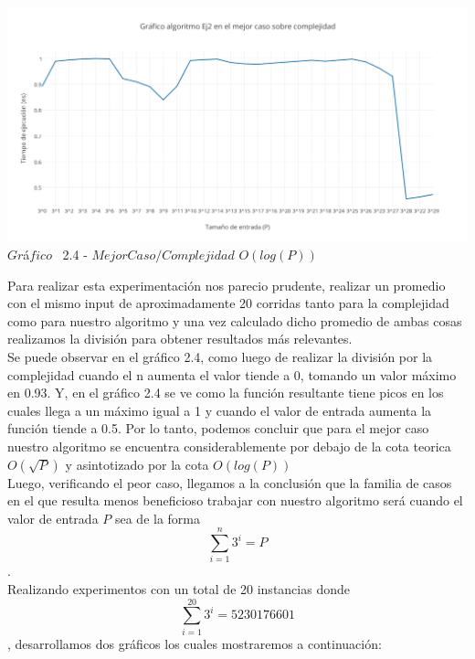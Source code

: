 \vspace*{0.3cm} \vspace*{0.3cm}
  \begin{center}
\includegraphics[scale=0.65]{./EJ2/mejorcaso3.png}
{$Gr$\'a$fico$ \ 2.4 - $Mejor Caso / Complejidad$ $O(log(P))$}
  \end{center}
  \vspace*{0.3cm}

Para realizar esta experimentaci\'on nos parecio prudente, realizar un promedio con el mismo input de aproximadamente 20 corridas
tanto para la complejidad como para nuestro algoritmo y una vez calculado dicho promedio de ambas cosas realizamos la divisi\'on para
obtener resultados m\'as relevantes.\\ 

Se puede observar en el gr\'afico 2.4, como luego de realizar la divisi\'on por la complejidad cuando el n aumenta el valor tiende a 0, tomando un valor m\'aximo en 0.93. Y, en el gr\'afico 2.4 se ve como la funci\'on resultante tiene picos en los cuales llega a un m\'aximo igual a 1 y cuando el valor de entrada aumenta la funci\'on tiende a 0.5. Por lo tanto, podemos concluir que para el mejor caso nuestro algoritmo se encuentra considerablemente por debajo de la cota teorica $O(\sqrt{P})$ y asintotizado por la cota $O(log(P))$\\

Luego, verificando el peor caso, llegamos a la conclusi\'on que la familia de casos en el que resulta menos beneficioso trabajar con nuestro algoritmo ser\'a cuando el valor de entrada $P$ sea de la forma \[
\sum_{i=1}^{n}3^{i}=P 
\].
\\

Realizando experimentos con un total de 20 instancias donde \[
\sum_{i=1}^{20}3^{i}=5230176601 
\], desarrollamos dos gr\'aficos los cuales mostraremos a continuaci\'on: \\


